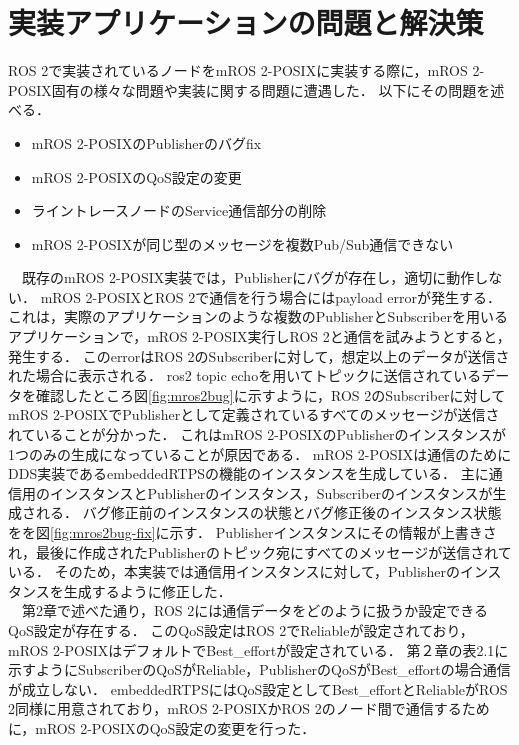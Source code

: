 \section{実装アプリケーションの問題と解決策}
ROS 2で実装されているノードをmROS 2-POSIXに実装する際に，mROS 2-POSIX固有の様々な問題や実装に関する問題に遭遇した．
以下にその問題を述べる．
\begin{itemize}
    \item mROS 2-POSIXのPublisherのバグfix
    \item mROS 2-POSIXのQoS設定の変更
    \item ライントレースノードのService通信部分の削除
    \item mROS 2-POSIXが同じ型のメッセージを複数Pub/Sub通信できない
\end{itemize}
　既存のmROS 2-POSIX実装では，Publisherにバグが存在し，適切に動作しない．
mROS 2-POSIXとROS 2で通信を行う場合にはpayload errorが発生する．
これは，実際のアプリケーションのような複数のPublisherとSubscriberを用いるアプリケーションで，mROS 2-POSIX実行しROS 2と通信を試みようとすると，発生する．
このerrorはROS 2のSubscriberに対して，想定以上のデータが送信された場合に表示される．
ros2 topic echoを用いてトピックに送信されているデータを確認したところ図\ref{fig:mros2bug}に示すように，ROS 2のSubscriberに対してmROS 2-POSIXでPublisherとして定義されているすべてのメッセージが送信されていることが分かった．
これはmROS 2-POSIXのPublisherのインスタンスが1つのみの生成になっていることが原因である．
mROS 2-POSIXは通信のためにDDS実装であるembeddedRTPSの機能のインスタンスを生成している．
主に通信用のインスタンスとPublisherのインスタンス，Subscriberのインスタンスが生成される．
バグ修正前のインスタンスの状態とバグ修正後のインスタンス状態をを図\ref{fig:mros2bug-fix}に示す．
Publisherインスタンスにその情報が上書きされ，最後に作成されたPublisherのトピック宛にすべてのメッセージが送信されている．
そのため，本実装では通信用インスタンスに対して，Publisherのインスタンスを生成するように修正した．
\\　第2章で述べた通り，ROS 2には通信データをどのように扱うか設定できるQoS設定が存在する．
このQoS設定はROS 2でReliableが設定されており，mROS 2-POSIXはデフォルトでBest\_effortが設定されている．
第２章の表2.1に示すようにSubscriberのQoSがReliable，PublisherのQoSがBest\_effortの場合通信が成立しない．
embeddedRTPSにはQoS設定としてBest\_effortとReliableがROS 2同様に用意されており，mROS 2-POSIXかROS 2のノード間で通信するために，mROS 2-POSIXのQoS設定の変更を行った．
